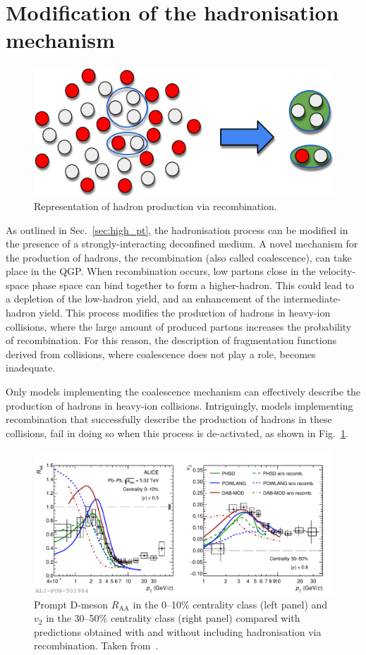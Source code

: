 \section{Modification of the hadronisation mechanism}
\begin{figure}[htb]
    \centering
    \includegraphics[width=0.7\linewidth]{Figures/Chapter 2/Coalescence.png}
    \caption{Representation of hadron production via recombination.}
\end{figure}

As outlined in Sec.~\ref{sec:high_pt}, the hadronisation process can be modified in the presence of a strongly-interacting deconfined medium. A novel mechanism for the production of hadrons, the recombination (also called coalescence), can take place in the QGP. When recombination occurs, low \pt partons close in the velocity-space phase space can bind together to form a higher-\pt hadron. This could lead to a depletion of the low-\pt hadron yield, and an enhancement of the intermediate-\pt hadron yield. This process modifies the production of hadrons in heavy-ion collisions, where the large amount of produced partons increases the probability of recombination. For this reason, the description of fragmentation functions derived from \ee collisions, where coalescence does not play a role, becomes inadequate. 

Only models implementing the coalescence mechanism can effectively describe the production of hadrons in heavy-ion collisions. Intriguingly, models implementing recombination that successfully describe the production of hadrons in these collisions, fail in doing so when this process is de-activated, as shown in Fig.~\ref{fig:D_recombination}. 

\begin{figure}[htb]
  \centering
  \includegraphics[width=\linewidth]{Figures/Chapter 2/D_Raa010_V23050_FragCoal_3models_1.pdf}
  \caption{Prompt D-meson $R_\mathrm{AA}$ in the 0--10\% centrality class (left panel) and $v_2$ in the 30--50\% centrality class (right panel) compared with predictions obtained with and without including hadronisation via recombination. Taken from~\cite{ALICE:2021rxa}.}
  \label{fig:D_recombination}
\end{figure}

